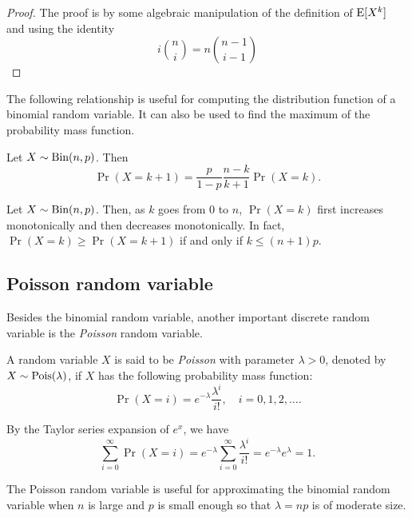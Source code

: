 \documentclass{article}
\begin{document}
\begin{proof}
  The proof is by some algebraic manipulation of the definition of $\operatorname{E}[X^k]$ and using the identity
  \[
    i \binom{n}{i} = n \binom{n - 1}{i - 1}
  \]
\end{proof}

The following relationship is useful for computing the distribution function of a binomial random variable.
It can also be used to find the maximum of the probability mass function.

\begin{proposition}[Relationship between $\Pr(X = k + 1)$ and $\Pr(X = k)$]
  Let $X \sim \textnormal{Bin}(n, p)$. Then
  \[
    \Pr(X = k + 1) = \frac{p}{1 - p} \frac{n - k}{k + 1} \Pr(X = k).
  \]
\end{proposition}

\begin{corollary}
  Let $X \sim \textnormal{Bin}(n, p)$.
  Then, as $k$ goes from $0$ to $n$, $\Pr(X = k)$ first increases monotonically and then decreases monotonically.
  In fact, $\Pr(X = k) \geq \Pr(X = k + 1)$ if and only if $k \leq (n + 1)p$.
\end{corollary}

\subsection{Poisson random variable}

Besides the binomial random variable, another important discrete random variable is the \emph{Poisson} random variable.

\begin{definition}
  A random variable $X$ is said to be \emph{Poisson} with parameter $\lambda > 0$, denoted by $X \sim \textnormal{Pois}(\lambda)$, if $X$ has the following probability mass function:
  \[
    \Pr(X = i) = e^{-\lambda} \frac{\lambda^i}{i!}, \quad i = 0, 1, 2, \ldots.
  \]
\end{definition}

\begin{remark}
  By the Taylor series expansion of $e^x$, we have
  \[
    \sum_{i = 0}^\infty \Pr(X = i) = e^{-\lambda} \sum_{i = 0}^\infty \frac{\lambda^i}{i!} = e^{-\lambda} e^\lambda = 1.
  \]
\end{remark}

The Poisson random variable is useful for approximating the binomial random variable when $n$ is large and $p$ is small enough so that $\lambda = np$ is of moderate size.
\end{document}
